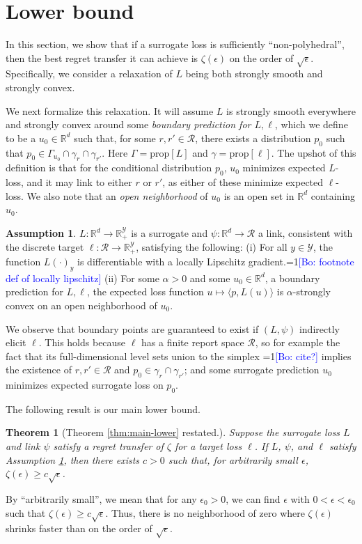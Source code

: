 \documentclass{article}
\newtheorem{theorem}{Theorem}
\theoremstyle{definition}\newtheorem{definition}{Definition}
\theoremstyle{definition}\newtheorem{assumption}{Assumption}
\newcommand{\Comments}{1}
\newcommand{\mynote}[2]{\ifnum\Comments=1\textcolor{#1}{#2}\fi}
\newcommand{\bo}[1]{\mynote{blue}{[Bo: #1]}}
\newcommand{\reals}{\mathbb{R}}
\newcommand{\prop}[1]{\mathrm{prop}[#1]}
\newcommand{\R}{\mathcal{R}}
\newcommand{\Y}{\mathcal{Y}}
\newcommand{\inprod}[2]{\langle #1, #2 \rangle}%
\begin{document}
\section{Lower bound} \label{sec:lower}

In this section, we show that if a surrogate loss is sufficiently ``non-polyhedral'', then the best regret transfer it can achieve is $\zeta(\epsilon)$ on the order of $\sqrt{\epsilon}$.
Specifically, we consider a relaxation of $L$ being both strongly smooth and strongly convex.

We next formalize this relaxation.
It will assume $L$ is strongly smooth everywhere and strongly convex around some \emph{boundary prediction for $L,\ell$}, which we define to be a $u_0 \in \reals^d$ such that, for some $r,r' \in \R$, there exists a distribution $p_0$ such that $p_0 \in \Gamma_{u_0} \cap \gamma_r \cap \gamma_{r'}$.
Here $\Gamma = \prop{L}$ and $\gamma = \prop{\ell}$.
The upshot of this definition is that for the conditional distribution $p_0$, $u_0$ minimizes expected $L$-loss, and it may link to either $r$ or $r'$, as either of these minimize expected $\ell$-loss.
We also note that an \emph{open neighborhood} of $u_0$ is an open set in $\reals^d$ containing $u_0$.

\begin{assumption} \label{assumption:lower}
  $L: \reals^d \to \reals^{\Y}_+$ is a surrogate and $\psi: \reals^d \to \R$ a link, consistent with the discrete target $\ell: \R \to \reals^{\Y}_+$, satisfying the following: (i) For all $y \in \Y$, the function $L(\cdot)_y$ is differentiable with a locally Lipschitz gradient.\bo{footnote def of locally lipschitz} (ii) For some $\alpha > 0$ and some $u_0 \in \reals^d$, a boundary prediction for $L,\ell$, the expected loss function $u \mapsto \inprod{p}{L(u)}$ is $\alpha$-strongly convex on an open neighborhood of $u_0$.
\end{assumption}

We observe that boundary points are guaranteed to exist if $(L,\psi)$ indirectly elicit $\ell$.
This holds because $\ell$ has a finite report space $\R$, so for example the fact that its full-dimensional level sets union to the simplex \bo{cite?} implies the existence of $r,r' \in \R$ and $p_0 \in \gamma_r \cap \gamma_{r'}$; and some surrogate prediction $u_0$ minimizes expected surrogate loss on $p_0$.

The following result is our main lower bound.
\begin{theorem}[Theorem \ref{thm:main-lower} restated.]
  Suppose the surrogate loss $L$ and link $\psi$ satisfy a regret transfer of $\zeta$ for a target loss $\ell$.
  If $L$, $\psi$, and $\ell$ satisfy Assumption \ref{assumption:lower}, then there exists $c > 0$ such that, for arbitrarily small $\epsilon$, $\zeta(\epsilon) \geq c \sqrt{\epsilon}$.
\end{theorem}
By ``arbitrarily small'', we mean that for any $\epsilon_0 > 0$, we can find $\epsilon$ with $0 < \epsilon < \epsilon_0$ such that $\zeta(\epsilon) \geq c \sqrt{\epsilon}$.
Thus, there is no neighborhood of zero where $\zeta(\epsilon)$ shrinks faster than on the order of $\sqrt{\epsilon}$.
\end{document}
